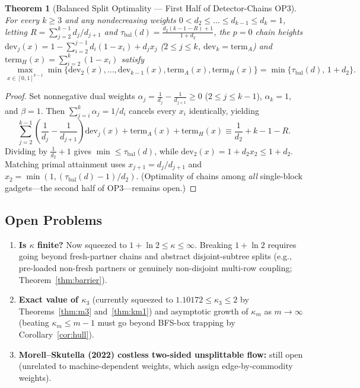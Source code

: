 \documentclass[11pt]{article}
\newtheorem{theorem}{Theorem}
\theoremstyle{definition}
\begin{document}
\begin{theorem}[Balanced Split Optimality --- First Half of Detector-Chains OP3]\label{thm:splitopt}
For every $k\ge 3$ and any nondecreasing weights $0<d_2\le\dots\le d_{k-1}\le d_k=1$, letting $R=\sum_{j=2}^{k-1}d_j/d_{j+1}$ and $\tau_{\mathrm{bal}}(d)=\frac{d_2(k-1-R)+1}{1+d_2}$, the $p=0$ chain heights $\mathrm{dev}_j(x)=1-\sum_{i=2}^{j-1}d_i(1-x_i)+d_jx_j$ ($2\le j\le k$, $\mathrm{dev}_k=\mathrm{term}_A$) and $\mathrm{term}_H(x)=\sum_{i=2}^k(1-x_i)$ satisfy
\[
 \max_{x\in[0,1]^{k-1}}\min\{\mathrm{dev}_2(x),\dots,\mathrm{dev}_{k-1}(x),\mathrm{term}_A(x),\mathrm{term}_H(x)\}
 = \min\{\tau_{\mathrm{bal}}(d),\,1+d_2\}.
\]
\end{theorem}
\begin{proof}
Set nonnegative dual weights $\alpha_j=\frac{1}{d_j}-\frac{1}{d_{j+1}}\ge 0$ ($2\le j\le k-1$), $\alpha_k=1$, and $\beta=1$. Then $\sum_{j=i}^k\alpha_j=1/d_i$ cancels every $x_i$ identically, yielding
\[
 \sum_{j=2}^{k-1}\!\left(\frac{1}{d_j}-\frac{1}{d_{j+1}}\right)\mathrm{dev}_j(x)+\mathrm{term}_A(x)+\mathrm{term}_H(x)
 \equiv \frac{1}{d_2}+k-1-R.
\]
Dividing by $\frac{1}{d_2}+1$ gives $\min\le\tau_{\mathrm{bal}}(d)$, while $\mathrm{dev}_2(x)=1+d_2 x_2\le 1+d_2$. Matching primal attainment uses $x_{j+1}=d_j/d_{j+1}$ and $x_2=\min(1,(\tau_{\mathrm{bal}}(d)-1)/d_2)$. (Optimality of chains among \emph{all} single-block gadgets---the second half of OP3---remains open.)
\end{proof}

\subsection*{Open Problems}
\begin{enumerate}
\item \textbf{Is $\kappa$ finite?} Now squeezed to $1+\ln 2\le\kappa\le\infty$. Breaking $1+\ln 2$ requires going beyond fresh-partner chains and abstract disjoint-subtree splits (e.g., pre-loaded non-fresh partners or genuinely non-disjoint multi-row coupling; Theorem~\ref{thm:barrier}).
\item \textbf{Exact value of $\kappa_3$} (currently squeezed to $1.10172\le \kappa_3\le 2$ by Theorems~\ref{thm:m3} and~\ref{thm:km1}) and asymptotic growth of $\kappa_m$ as $m\to\infty$ (beating $\kappa_m\le m-1$ must go beyond BFS-box trapping by Corollary~\ref{cor:hull}).
\item \textbf{Morell--Skutella (2022) costless two-sided unsplittable flow:} still open (unrelated to machine-dependent weights, which assign edge-by-commodity weights).
\end{enumerate}
\end{document}
